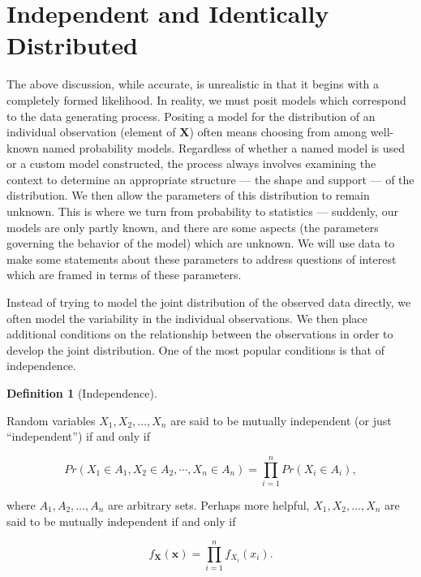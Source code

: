 \documentclass[
  letterpaper,
  DIV=11,
  numbers=noendperiod]{scrreprt}
\theoremstyle{definition}
\theoremstyle{definition}
\newtheorem{definition}{Definition}[chapter]
\theoremstyle{plain}
\theoremstyle{remark}
\begin{document}
\hypertarget{independent-and-identically-distributed}{%
\section{Independent and Identically
Distributed}\label{independent-and-identically-distributed}}

The above discussion, while accurate, is unrealistic in that it begins
with a completely formed likelihood. In reality, we must posit models
which correspond to the data generating process. Positing a model for
the distribution of an individual observation (element of
\(\mathbf{X}\)) often means choosing from among well-known named
probability models. Regardless of whether a named model is used or a
custom model constructed, the process always involves examining the
context to determine an appropriate structure --- the shape and support
--- of the distribution. We then allow the parameters of this
distribution to remain unknown. This is where we turn from probability
to statistics --- suddenly, our models are only partly known, and there
are some aspects (the parameters governing the behavior of the model)
which are unknown. We will use data to make some statements about these
parameters to address questions of interest which are framed in terms of
these parameters.

Instead of trying to model the joint distribution of the observed data
directly, we often model the variability in the individual observations.
We then place additional conditions on the relationship between the
observations in order to develop the joint distribution. One of the most
popular conditions is that of independence.

\begin{definition}[Independence]\protect\hypertarget{def-independence}{}\label{def-independence}

Random variables \(X_1, X_2, \dotsc, X_n\) are said to be mutually
independent (or just ``independent'') if and only if

\[Pr\left(X_1 \in A_1, X_2 \in A_2, \dotsb, X_n \in A_n\right) = \prod_{i=1}^{n} Pr\left(X_i \in A_i\right),\]

where \(A_1, A_2, \dotsc, A_n\) are arbitrary sets. Perhaps more
helpful, \(X_1, X_2, \dotsc, X_n\) are said to be mutually independent
if and only if

\[f_{\mathbf{X}}(\mathbf{x}) = \prod_{i=1}^{n} f_{X_i}\left(x_i\right).\]

\end{definition}
\end{document}
